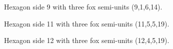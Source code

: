 \documentclass[11pt]{article}
\begin{document}
\begin{figure}[h!]
\centering
{}
\caption{Hexagon side 9 with three fox semi-units (9,1,6,14).}
\end{figure}

\begin{figure}[h!]
\centering
{}
\caption{Hexagon side 11 with three fox semi-units (11,5,5,19).}
\end{figure}

\begin{figure}[h!]
\centering
{}
\caption{Hexagon side 12 with three fox semi-units (12,4,5,19).}
\end{figure}
\end{document}
